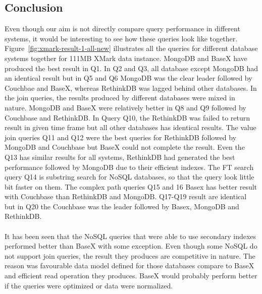 \subsection{Conclusion}
Even though our aim is not directly compare query performance in different systems, it would be interesting to see how these queries look like together. Figure~\ref{fig:xmark-result-1-all-new} illustrates all the queries for different database systems together for 111MB XMark data instance. MongoDB and BaseX have produced the best result in Q1. In Q2 and Q3, all database except MongoDB  had an identical result but in Q5 and Q6 MongoDB was the clear leader followed by Couchbae and BaseX, whereas RethinkDB was lagged behind other databases. In the join queries, the results produced by different databases were mixed in nature. MongoDB and BaseX were relatively better in Q8 and Q9 followed by Couchbase and RethinkDB. In Query Q10, the RethinkDB was failed to return result in given time frame but all other databases has identical results. The value join queries Q11 and Q12 were the best queries for RethinkDB followed by MongoDB and Couchbase but BaseX could not complete the result. Even the Q13 has similar results for all systems, RethinkDB had generated the best performance followed by MongoDB due to their efficient indexes. The FT search query Q14 is substring search for NoSQL databases, so that the query look little bit faster on them. The complex path queries Q15 and 16 Basex has better result with Couchbase than RethinkDB and MongoDB.
Q17-Q19 result are identical but in Q20 the Couchbase was the leader followed by Basex, MongoDB and RethinkDB. 
\\
\\
It has been seen that the NoSQL queries that were able to use secondary indexes performed better than BaseX with some exception. Even though some NoSQL do not support join queries, the result they produces are competitive in nature. The reason was favourable data model defined for those databases compare to BaseX and efficient read operation they produces. BaseX would probably perform better if the queries were optimized or data were normalized.  

